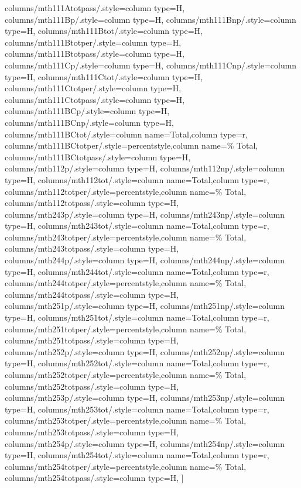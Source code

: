\documentclass[varwidth]{standalone}
\begin{document}
{    columns/mth111Atotpass/.style={column type=H},
    columns/mth111Bp/.style={column type=H},
    columns/mth111Bnp/.style={column type=H},
    columns/mth111Btot/.style={column type=H},
    columns/mth111Btotper/.style={column type=H},
    columns/mth111Btotpass/.style={column type=H},
    columns/mth111Cp/.style={column type=H},
    columns/mth111Cnp/.style={column type=H},
    columns/mth111Ctot/.style={column type=H},
    columns/mth111Ctotper/.style={column type=H},
    columns/mth111Ctotpass/.style={column type=H},
    columns/mth111BCp/.style={column type=H},
    columns/mth111BCnp/.style={column type=H},
    columns/mth111BCtot/.style={column name=Total,column type=r},
    columns/mth111BCtotper/.style={percentstyle,column name=\% Total},
    columns/mth111BCtotpass/.style={column type=H},
    columns/mth112p/.style={column type=H},
    columns/mth112np/.style={column type=H},
    columns/mth112tot/.style={column name=Total,column type=r},
    columns/mth112totper/.style={percentstyle,column name=\% Total},
    columns/mth112totpass/.style={column type=H},
    columns/mth243p/.style={column type=H},
    columns/mth243np/.style={column type=H},
    columns/mth243tot/.style={column name=Total,column type=r},
    columns/mth243totper/.style={percentstyle,column name=\% Total},
    columns/mth243totpass/.style={column type=H},
    columns/mth244p/.style={column type=H},
    columns/mth244np/.style={column type=H},
    columns/mth244tot/.style={column name=Total,column type=r},
    columns/mth244totper/.style={percentstyle,column name=\% Total},
    columns/mth244totpass/.style={column type=H},
    columns/mth251p/.style={column type=H},
    columns/mth251np/.style={column type=H},
    columns/mth251tot/.style={column name=Total,column type=r},
    columns/mth251totper/.style={percentstyle,column name=\% Total},
    columns/mth251totpass/.style={column type=H},
    columns/mth252p/.style={column type=H},
    columns/mth252np/.style={column type=H},
    columns/mth252tot/.style={column name=Total,column type=r},
    columns/mth252totper/.style={percentstyle,column name=\% Total},
    columns/mth252totpass/.style={column type=H},
    columns/mth253p/.style={column type=H},
    columns/mth253np/.style={column type=H},
    columns/mth253tot/.style={column name=Total,column type=r},
    columns/mth253totper/.style={percentstyle,column name=\% Total},
    columns/mth253totpass/.style={column type=H},
    columns/mth254p/.style={column type=H},
    columns/mth254np/.style={column type=H},
    columns/mth254tot/.style={column name=Total,column type=r},
    columns/mth254totper/.style={percentstyle,column name=\% Total},
    columns/mth254totpass/.style={column type=H},
]{\diversitydata}
}
\end{document}
